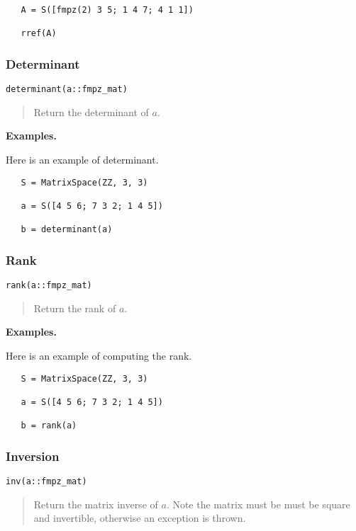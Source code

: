 \documentclass[a4paper,10pt]{article}
\newcommand{\desc}[1]{\vspace{-3mm}\begin{quote}#1\end{quote}}
\begin{document}
{{\begin{lstlisting}
   A = S([fmpz(2) 3 5; 1 4 7; 4 1 1])
   
   rref(A)
\end{lstlisting}

\subsubsection{Determinant}

\begin{lstlisting}
determinant(a::fmpz_mat)
\end{lstlisting}

\desc{Return the determinant of $a$.}

\textbf{Examples.}

Here is an example of determinant.

\begin{lstlisting}
   S = MatrixSpace(ZZ, 3, 3)

   a = S([4 5 6; 7 3 2; 1 4 5])

   b = determinant(a)
\end{lstlisting}

\subsubsection{Rank}

\begin{lstlisting}
rank(a::fmpz_mat)
\end{lstlisting}

\desc{Return the rank of $a$.}

\textbf{Examples.}

Here is an example of computing the rank.

\begin{lstlisting}
   S = MatrixSpace(ZZ, 3, 3)

   a = S([4 5 6; 7 3 2; 1 4 5])

   b = rank(a)
\end{lstlisting}

\subsubsection{Inversion}

\begin{lstlisting}
inv(a::fmpz_mat)
\end{lstlisting}

\desc{Return the matrix inverse of $a$. Note the matrix must be must be square and
invertible, otherwise an exception is thrown.}

}}
\end{document}
